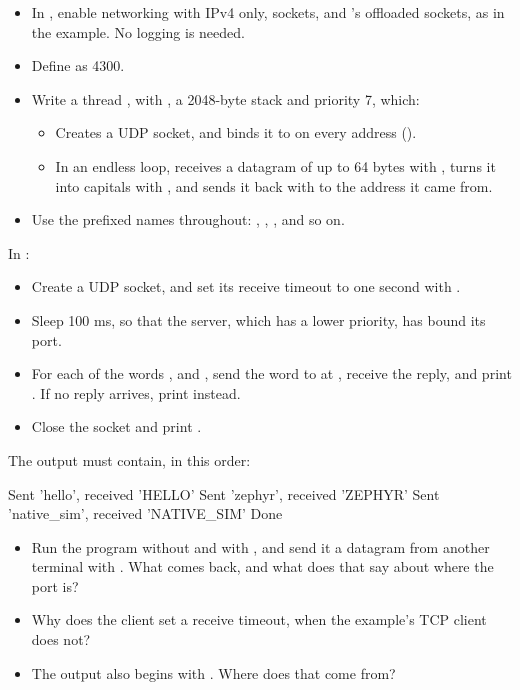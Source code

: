 \begin{itemize}
  \item In , enable networking with IPv4 only, sockets, and ’s offloaded
    sockets, as in the  example. No logging is needed.
  \item Define  as 4300.
  \item Write a thread , with , a 2048-byte stack and priority 7,
    which:
\begin{itemize}
  \item Creates a UDP socket, and binds it to  on every address ().
  \item In an endless loop, receives a datagram of up to 64 bytes with , turns it
    into capitals with , and sends it back with  to the address it
    came from.
\end{itemize}
  \item Use the prefixed names throughout: , ,
    , and so on.
\end{itemize}

\label{c6:ex:5.2}

In :

\begin{itemize}
  \item Create a UDP socket, and set its receive timeout to one second with .
  \item Sleep 100 ms, so that the server, which has a lower priority, has bound its port.
  \item For each of the words ,  and , send the word to
     at , receive the reply, and print . If no reply arrives, print  instead.
  \item Close the socket and print .
\end{itemize}

The output must contain, in this order:

\begin{console}
Sent 'hello', received 'HELLO'
Sent 'zephyr', received 'ZEPHYR'
Sent 'native_sim', received 'NATIVE_SIM'
Done
\end{console}

\begin{itemize}
  \item Run the program without  and with , and send it a datagram from
    another terminal with . What comes back, and
    what does that say about where the port is?
  \item Why does the client set a receive timeout, when the example’s TCP client does not?
  \item The output also begins with . Where does
    that come from?
\end{itemize}
